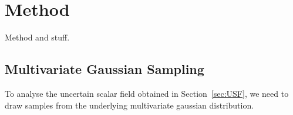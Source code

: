 \chapter{Method}\label{chap:Method}

Method and stuff.

\section{Multivariate Gaussian Sampling}\label{sec:MGS}

To analyse the uncertain scalar field obtained in Section~\ref{sec:USF},
we need to draw samples from the underlying multivariate gaussian
distribution.
